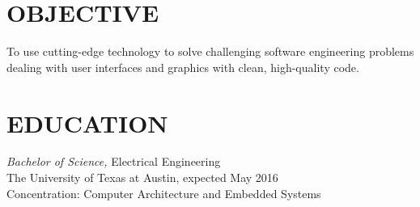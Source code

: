 \documentclass[margin]{res}
\begin{document}
\vspace{-3.5em}
\address{6109 Shadow Valley Dr Unit A\\
  Austin, TX 78731}
\address{\href{mailto:hershal.bhave@gmail.com}{\ul{\texttt{hershal.bhave@gmail.com}}} \\
  \href{https://github.com/hershal}{\ul{\texttt{github.com/hershal}}}}
\begin{resume}
  \section{OBJECTIVE}
  To use cutting-edge technology to solve challenging software engineering
  problems dealing with user interfaces and graphics with clean, high-quality
  code.
  \section{EDUCATION}
  {\sl Bachelor of Science,} Electrical Engineering \\
  The University of Texas at Austin, expected May 2016 \\
  Concentration: Computer Architecture and Embedded Systems

\end{resume}
\end{document}
